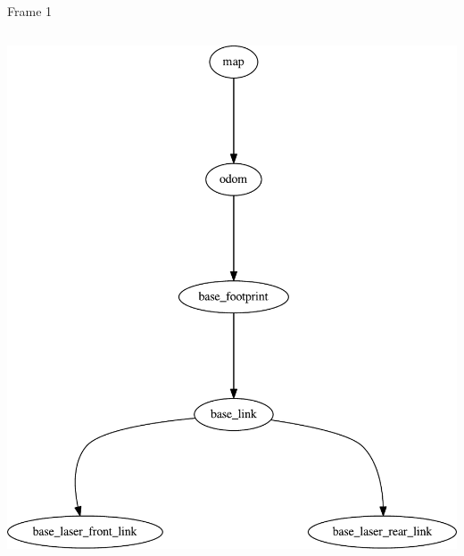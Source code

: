 \begin{frame}{Frame 1}
\begin{columns}
\begin{column}{0.4\textwidth}  %
\includegraphics[width=\textwidth]{slides/gfx/frames_cleaned}
\end{column}
\end{columns}

 
\end{frame}